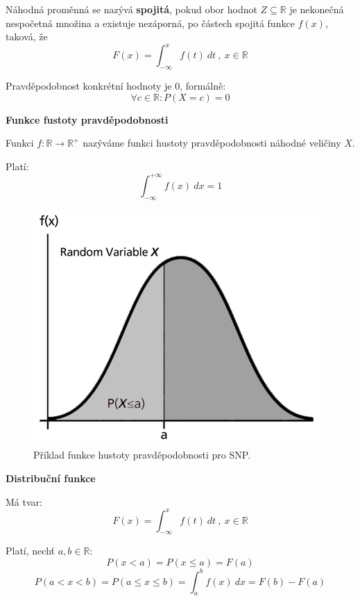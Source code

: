 \begin{compactitem}
    \item Náhodná proměnná se nazývá \textbf{spojitá}, pokud obor hodnot $Z \subseteq \mathbb{R}$ je nekonečná nespočetná množina a existuje nezáporná, po částech spojitá funkce $f(x)$, taková, že
    $$ F(x) = \int_{- \infty}^{x} f(t) ~ dt ~,~ x \in \mathbb{R} $$

    \item Pravděpodobnost konkrétní hodnoty je $0$, formálně:
    $$ \forall c \in \mathbb{R} : P(X=c) = 0$$

    \item \textbf{Funkce fustoty pravděpodobnosti} \begin{compactitem}
        \item Funkci $f : \mathbb{R} \rightarrow \mathbb{R}^{+}$ nazýváme funkci hustoty pravděpodobnosti náhodné veličiny $X$.

        \item Platí:
        $$  $$
        $$ \int_{- \infty}^{+ \infty} f(x) ~ dx = 1$$
    \end{compactitem}

    \begin{figure}[H]
        \centering
        \includegraphics[width=0.5\linewidth]{snp_probability_density_function.png}
        \caption{Příklad funkce hustoty pravděpodobnosti pro SNP.}
    \end{figure}

    \item \textbf{Distribuční funkce} \begin{compactitem}
        \item Má tvar:
        $$ F(x) = \int_{- \infty}^{x} f(t) ~ dt ~,~ x \in \mathbb{R} $$

        \item Platí, nechť $a, b \in \mathbb{R}$:
        $$ P(x < a) = P(x \leq a) = F(a) $$
        $$ P(a < x < b) = P(a \leq x \leq b) = \int_a^b f(x) ~ dx = F(b) - F(a) $$
    \end{compactitem}


\end{compactitem}
